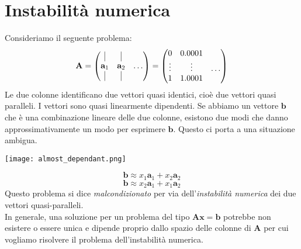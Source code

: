 \documentclass{article}
\begin{document}
    \section{Instabilità numerica}
        Consideriamo il seguente problema:
        \[\mathbf{A} = \begin{pmatrix}
            \vline & \vline & \\
            \mathbf{a}_1 & \mathbf{a}_2 & \dots \\
            \vline & \vline & \\
        \end{pmatrix} = \begin{pmatrix}
            0 & 0.0001 & \\
            \vdots & \vdots & \dots \\
            1 & 1.0001 &
        \end{pmatrix}\]
        Le due colonne identificano due vettori quasi identici, cioè due vettori quasi paralleli. I vettori sono quasi linearmente 
        dipendenti. Se abbiamo un vettore $\mathbf{b}$ che è una combinazione lineare delle due colonne, esistono due modi che danno 
        approssimativamente un modo per esprimere $\mathbf{b}$. Questo ci porta a una situazione ambigua.
        \begin{center}\texttt{[image: almost\_dependant.png]}\end{center}
        \[\mathbf{b} \approx x_1\mathbf{a}_1 + x_2\mathbf{a}_2\]
        \[\mathbf{b} \approx x_2\mathbf{a}_1 + x_1\mathbf{a}_2\]
        Questo problema si dice \emph{malcondizionato} per via dell'\emph{instabilità numerica} dei due vettori quasi-paralleli. \\
        In generale, una soluzione per un problema del tipo $\mathbf{Ax}=\mathbf{b}$ potrebbe non esistere o essere unica e dipende proprio 
        dallo spazio delle colonne di $\mathbf{A}$ per cui vogliamo risolvere il problema dell'instabilità numerica.
    
\end{document}
